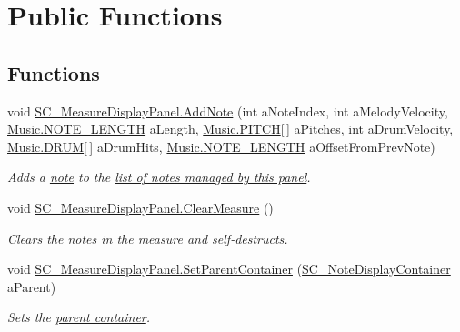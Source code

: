 \hypertarget{group___s_c___m_d_p_pub_func}{}\section{Public Functions}
\label{group___s_c___m_d_p_pub_func}
\subsection*{Functions}
\begin{DoxyCompactItemize}
\item 
void \hyperlink{group___s_c___m_d_p_pub_func_gadce2fd2e70d867b38c98305e2392b3df}{S\+C\+\_\+\+Measure\+Display\+Panel.\+Add\+Note} (int a\+Note\+Index, int a\+Melody\+Velocity, \hyperlink{group___music_enums_gaf11b5f079adbb21c800b9eca1c5c3cbd}{Music.\+N\+O\+T\+E\+\_\+\+L\+E\+N\+G\+TH} a\+Length, \hyperlink{group___music_enums_ga508f69b199ea518f935486c990edac1d}{Music.\+P\+I\+T\+CH}\mbox{[}$\,$\mbox{]} a\+Pitches, int a\+Drum\+Velocity, \hyperlink{group___music_enums_gade475b4382c7066d1af13e7c13c029b6}{Music.\+D\+R\+UM}\mbox{[}$\,$\mbox{]} a\+Drum\+Hits, \hyperlink{group___music_enums_gaf11b5f079adbb21c800b9eca1c5c3cbd}{Music.\+N\+O\+T\+E\+\_\+\+L\+E\+N\+G\+TH} a\+Offset\+From\+Prev\+Note)
\begin{DoxyCompactList}\small\item\em Adds a \hyperlink{group___music_structs_struct_music_1_1_combined_note}{note} to the \hyperlink{group___s_c___m_d_p_priv_var_gaf8a533bce87e58d8f7a1da88f476ac6f}{list of notes managed by this panel}. \end{DoxyCompactList}\item 
void \hyperlink{group___s_c___m_d_p_pub_func_ga5c4379bcb1309f70b7406eb6523c6179}{S\+C\+\_\+\+Measure\+Display\+Panel.\+Clear\+Measure} ()
\begin{DoxyCompactList}\small\item\em Clears the notes in the measure and self-\/destructs. \end{DoxyCompactList}\item 
void \hyperlink{group___s_c___m_d_p_pub_func_ga334c177603c25d6206b7c7b639281b07}{S\+C\+\_\+\+Measure\+Display\+Panel.\+Set\+Parent\+Container} (\hyperlink{class_s_c___note_display_container}{S\+C\+\_\+\+Note\+Display\+Container} a\+Parent)
\begin{DoxyCompactList}\small\item\em Sets the \hyperlink{group___doc_s_c___n_d_c}{parent container}. \end{DoxyCompactList}\item 

\end{DoxyCompactItemize}

